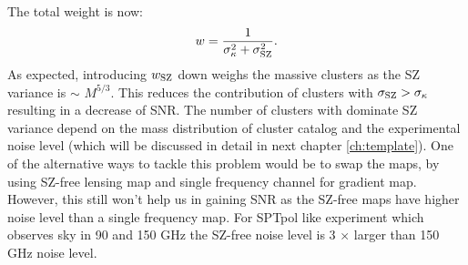 The total weight is now:
 \begin{equation}
 w = \frac{1}{\sigma_{\kappa}^{2} + \sigma_{\rm SZ}^{2}}.
\label{eq_cluster_weight}
 \end{equation}
 As expected, introducing $w_{\rm SZ}$ down weighs the massive clusters as the SZ variance is $\sim$ $M^{5/3}$.
 This reduces the contribution of clusters with $\sigma_{\rm SZ} > \sigma_{\kappa}$ resulting in a decrease of SNR. 
 The number of clusters with dominate SZ variance depend on the mass distribution of cluster catalog and the experimental noise level (which will be discussed in detail in next chapter \ref{ch:template}).
 One of the alternative ways to tackle this problem would be to swap the maps, by using SZ-free lensing map and single frequency channel for gradient map.
However, this still won't help us in gaining SNR as the SZ-free maps have higher noise level than a single frequency map. 
For SPTpol like experiment which observes sky in 90 and 150 GHz the SZ-free noise level is 3 $\times$ larger than 150 GHz noise level. %
